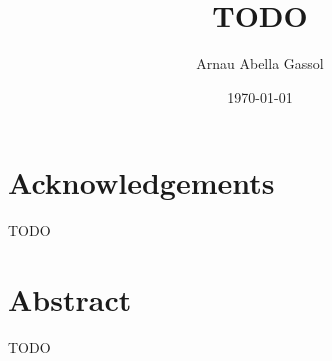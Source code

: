\documentclass[12pt, a4paper]{report}
\title{TODO}
\author{%
Arnau Abella Gassol
}
\date{\today}
\begin{document}
\maketitle

\chapter*{Acknowledgements}%
TODO

\chapter*{Abstract}%
TODO

\tableofcontents
\listoffigures
\listoftables
\listofalgorithms
{}
\listoflistings
{}










\begin{appendices}

\end{appendices}



\end{document}
